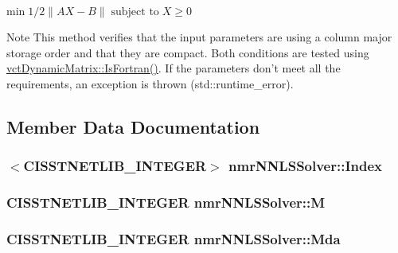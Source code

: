 $ \mbox{min} \; 1 / 2 \| AX - B \| \; \mbox{subject to} \; X \geq 0$

\begin{DoxyNote}{Note}
This method verifies that the input parameters are using a column major storage order and that they are compact. Both conditions are tested using \hyperlink{classvct_dynamic_const_matrix_base_aac5f19015b4888f760f99daa4bac199c}{vct\-Dynamic\-Matrix\-::\-Is\-Fortran()}. If the parameters don't meet all the requirements, an exception is thrown (std\-::runtime\-\_\-error). 
\end{DoxyNote}


\subsection{Member Data Documentation}
\hypertarget{classnmr_n_n_l_s_solver_a8a75f7f12aceebd264f973684ce1b683}{
\subsubsection[{Index}]{$<$C\-I\-S\-S\-T\-N\-E\-T\-L\-I\-B\-\_\-\-I\-N\-T\-E\-G\-E\-R$>$ nmr\-N\-N\-L\-S\-Solver\-::\-Index\hspace{0.3cm}{\ttfamily [protected]}}}\label{classnmr_n_n_l_s_solver_a8a75f7f12aceebd264f973684ce1b683}
\hypertarget{classnmr_n_n_l_s_solver_a162e5dd1f43365b957bb2ba090cb0195}{
\subsubsection[{M}]{\setlength{\rightskip}{0pt plus 5cm}C\-I\-S\-S\-T\-N\-E\-T\-L\-I\-B\-\_\-\-I\-N\-T\-E\-G\-E\-R nmr\-N\-N\-L\-S\-Solver\-::\-M\hspace{0.3cm}{\ttfamily [protected]}}}\label{classnmr_n_n_l_s_solver_a162e5dd1f43365b957bb2ba090cb0195}
\hypertarget{classnmr_n_n_l_s_solver_a11885a66db967a587d588df43f31747a}{
\subsubsection[{Mda}]{\setlength{\rightskip}{0pt plus 5cm}C\-I\-S\-S\-T\-N\-E\-T\-L\-I\-B\-\_\-\-I\-N\-T\-E\-G\-E\-R nmr\-N\-N\-L\-S\-Solver\-::\-Mda\hspace{0.3cm}{\ttfamily [protected]}}}\label{classnmr_n_n_l_s_solver_a11885a66db967a587d588df43f31747a}
